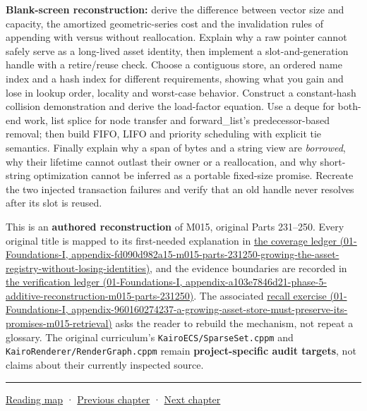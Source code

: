 \textbf{Blank-screen reconstruction:} derive the difference between vector size and capacity, the amortized geometric-series cost and the invalidation rules of appending with versus without reallocation. Explain why a raw pointer cannot safely serve as a long-lived asset identity, then implement a slot-and-generation handle with a retire/reuse check. Choose a contiguous store, an ordered name index and a hash index for different requirements, showing what you gain and lose in lookup order, locality and worst-case behavior. Construct a constant-hash collision demonstration and derive the load-factor equation. Use a deque for both-end work, list splice for node transfer and forward\_list's predecessor-based removal; then build FIFO, LIFO and priority scheduling with explicit tie semantics. Finally explain why a span of bytes and a string view are \emph{borrowed}, why their lifetime cannot outlast their owner or a reallocation, and why short-string optimization cannot be inferred as a portable fixed-size promise. Recreate the two injected transaction failures and verify that an old handle never resolves after its slot is reused.

This is an \textbf{authored reconstruction} of M015, original Parts 231--250. Every original title is mapped to its first-needed explanation in \href{../01-Foundations-I/main.pdf\#nameddest=appendix-fd090d982a15-m015-parts-231250-growing-the-asset-registry-without-losing-identities}{the coverage ledger (01-Foundations-I, appendix-fd090d982a15-m015-parts-231250-growing-the-asset-registry-without-losing-identities)}, and the evidence boundaries are recorded in \href{../01-Foundations-I/main.pdf\#nameddest=appendix-a103e7846d21-phase-5-additive-reconstruction-m015-parts-231250}{the verification ledger (01-Foundations-I, appendix-a103e7846d21-phase-5-additive-reconstruction-m015-parts-231250)}. The associated \href{../01-Foundations-I/main.pdf\#nameddest=appendix-960160274237-a-growing-asset-store-must-preserve-its-promises-m015-retrieval}{recall exercise (01-Foundations-I, appendix-960160274237-a-growing-asset-store-must-preserve-its-promises-m015-retrieval)} asks the reader to rebuild the mechanism, not repeat a glossary. The original curriculum's \texttt{KairoECS/SparseSet.cppm} and \texttt{KairoRenderer/RenderGraph.cppm} remain \textbf{project-specific audit targets}, not claims about their currently inspected source.

\begin{center}\rule{0.5\linewidth}{0.5pt}\end{center}

\hyperref[volume-reading-map]{Reading map} · \hyperref[05-engine-i-ch004-resource-ownership-failure-paths-and-review-practice]{Previous chapter} · \hyperref[05-engine-i-ch006-queries-lazy-ranges-allocators-and-module-boundaries]{Next chapter}
